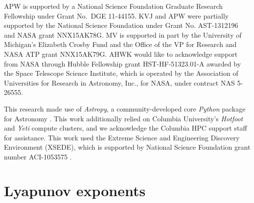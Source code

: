 \documentclass[letterpaper,12pt,preprint]{aastex}
\newcommand{\project}[1]{\textsl{#1}}
\begin{document}
APW is supported by a National Science Foundation Graduate Research Fellowship under Grant No.\ DGE 11-44155. KVJ and APW were partially supported by the National Science Foundation under Grant No. AST-1312196 and NASA grant NNX15AK78G. MV is supported in part by the University of Michigan's Elizabeth Crosby Fund and the Office of the VP for Research and NASA ATP grant NNX15AK79G. AHWK would like to acknowledge support from NASA through Hubble Fellowship grant HST-HF-51323.01-A awarded by the Space Telescope Science Institute, which is operated by the Association of Universities for Research in Astronomy, Inc., for NASA, under contract NAS 5-26555.

This research made use of \project{Astropy}, a community-developed core \project{Python} package for Astronomy \citep{astropy13}. This work additionally relied on Columbia University's \emph{Hotfoot} and \emph{Yeti} compute clusters, and we acknowledge the Columbia HPC support staff for assistance. This work used the Extreme Science and Engineering Discovery Environment (XSEDE), which is supported by National Science Foundation grant number ACI-1053575 \citep{xsede}.




\appendix
\section{Lyapunov exponents} \label{sec:lyapapdx}
\end{document}
